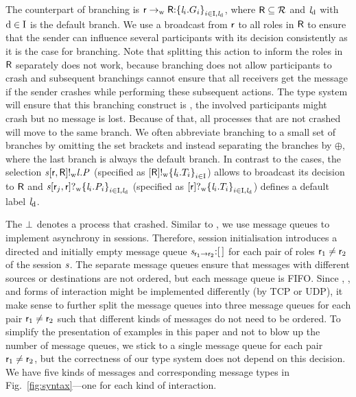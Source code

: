 The \weakR counterpart of branching is $ \GBranW{\Role}{\Role[R]}{\Set{\Label_i.\GT_i}_{i \in \indexSet, \LabelD}} $, where $ \Role[R] \subseteq \roles $ and $ \LabelD $ with $ \default \in \indexSet $ is the default branch.
We use a broadcast from $ \Role $ to all roles in $ \Role[R] $ to ensure that the sender can influence several participants with its decision consistently as it is the case for \strongR branching.
Note that splitting this action to inform the roles in $ \Role[R] $ separately does not work, because \strongR branching does not allow participants to crash and subsequent \weakR branchings cannot ensure that all receivers get the message if the sender crashes while performing these subsequent actions.
The type system will ensure that this branching construct is \weakR, \ie the involved participants might crash but no message is lost.
Because of that, all processes that are not crashed will move to the same branch.
We often abbreviate branching \wrt to a small set of branches by omitting the set brackets and instead separating the branches by $ \oplus $, where the last branch is always the default branch.
In contrast to the \strongR cases, the \weakR selection $ \PSelW{\Chan}{\Role}{\Role[R]}{\Label}{\PT} $ (specified as $ \LSelW{\Role[R]}{\Set{ \Label_i.\LT_i }_{i \in \indexSet}} $) allows to broadcast its decision to $ \Role[R] $ and $ \PBranW{\Chan}{\Role_j}{\Role}{\Set{ \Label_i.\PT_i }_{i \in \indexSet, \LabelD}} $ (specified as $ \LBranW{\Role}{\Set{ \Label_i.\LT_i }_{i \in \indexSet, \LabelD}} $) defines a default label $ \LabelD $.

The $ \PCrash $ denotes a process that crashed.
Similar to \cite{hondaYoshidaCarbone16}, we use message queues to implement asynchrony in sessions.
Therefore, session initialisation introduces a directed and initially empty message queue $ \MQ{\Chan[s]}{\Role_1}{\Role_2}{\emptyList} $ for each pair of roles $ \Role_1 \neq \Role_2 $ of the session $ \Chan[s] $.
The separate message queues ensure that messages with different sources or destinations are not ordered, but each message queue is FIFO.
Since \strongR, \weakR, and \unrel forms of interaction might be implemented differently (\eg by TCP or UDP), it make sense to further split the message queues into three message queues for each pair $ \Role_1 \neq \Role_2 $ such that different kinds of messages do not need to be ordered.
To simplify the presentation of examples in this paper and not to blow up the number of message queues, we stick to a single message queue for each pair $ \Role_1 \neq \Role_2 $, but the correctness of our type system does not depend on this decision.
We have five kinds of messages and corresponding message types in Fig.~\ref{fig:syntax}---one for each kind of interaction.

